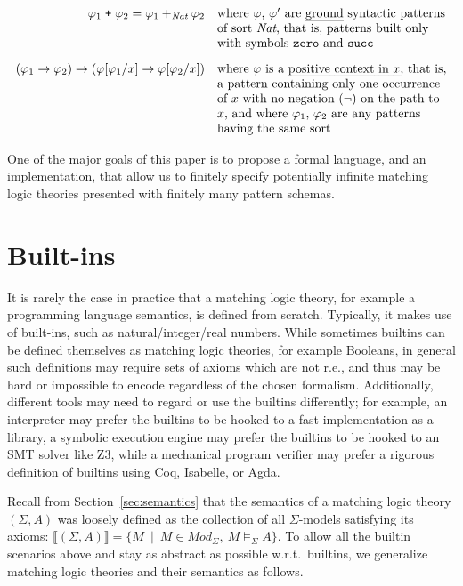 \documentclass[UTF8,11pt]{article}
\theoremstyle{plain}
\theoremstyle{definition}
\theoremstyle{remark}
\newcommand{\Nat}{\textit{Nat}}
\newcommand{\Mod}{\textit{Mod}}
\newcommand{\denote}[1]{\llbracket{#1}\rrbracket}
\begin{document}
$$\begin{array}{rl}
\varphi_1 \mathrel{\texttt{+}} \varphi_2 = \varphi_1 +_\Nat \varphi_2
& \textrm{where $\varphi$, $\varphi'$ are \emph{ground} syntactic patterns}
\\
&\textrm{of sort $\Nat$, that is, patterns built only}
\\
&\textrm{with symbols \texttt{zero} and \texttt{succ}}
\\[2ex]
(\varphi_1 \rightarrow \varphi_2) \rightarrow
(\varphi[\varphi_1 / x] \rightarrow \varphi[\varphi_2 / x])
& \textrm{where $\varphi$ is a \emph{positive context in $x$}, that is,}
\\
& \textrm{a pattern
containing only one occurrence}
\\
&\textrm{of $x$ with no negation ($\neg$) on the path to}
\\
&\textrm{$x$, and where $\varphi_1$, $\varphi_2$ are any patterns}
\\
&\textrm{having the same sort}
\end{array}
$$

One of the major goals of this paper is to propose a formal language,
and an implementation, that allow us to finitely specify potentially
infinite matching logic theories presented with finitely many pattern schemas.

\section{Built-ins}
\label{sec:builtins}

It is rarely the case in practice that a matching logic theory, for example
a programming language semantics, is defined from scratch.
Typically, it makes use of built-ins, such as natural/integer/real numbers.
While sometimes builtins can be defined themselves as matching logic theories,
for example Booleans, in general such definitions may require sets of axioms
which are not r.e., and thus may be hard or impossible to encode regardless
of the chosen formalism.
Additionally, different tools may need to regard or use the builtins
differently;
for example, an interpreter may prefer the builtins to be hooked to a
fast implementation as a library, a symbolic execution engine may prefer the
builtins to be hooked to an SMT solver like Z3, while a mechanical program
verifier may prefer a rigorous definition of builtins using Coq, Isabelle,
or Agda.

Recall from Section~\ref{sec:semantics} that the semantics of a matching
logic theory $(\Sigma,A)$ was loosely defined as the collection of all
$\Sigma$-models satisfying its axioms: $\denote{(\Sigma,A)} =
\{M \ \mid \ M \in \Mod_{\Sigma},\ M \models_{\Sigma} A \}$.
To allow all the builtin scenarios above and stay as abstract as possible
w.r.t.~builtins, we generalize matching logic theories and their semantics
as follows.
\end{document}
